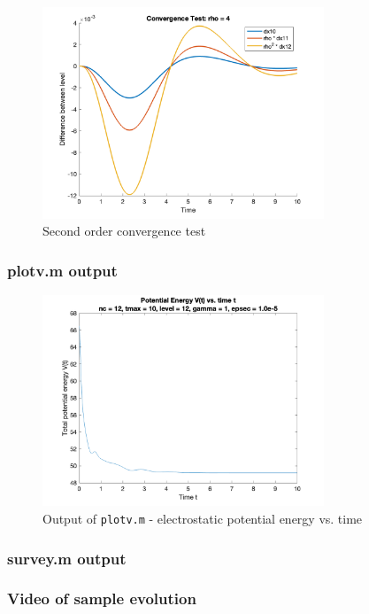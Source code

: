\documentclass[10pt]{article}
\def\code#1{\texttt{#1}} %
\begin{document}
\begin{figure}[H]
\centering
\includegraphics[width=0.75\textwidth]{ConvTest_4.png}
\caption{Second order convergence test}
\end{figure}

\subsubsection*{plotv.m output}

\begin{figure}[H]
\centering
\includegraphics[width=0.75\textwidth]{plotv_output.png}
\caption{Output of \code{plotv.m} - electrostatic potential energy vs. time}
\end{figure}

\subsubsection*{survey.m output}




\subsubsection*{Video of sample evolution}
\end{document}
